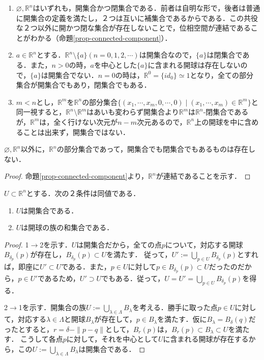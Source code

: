 \documentclass[uplatex,dvipdfmx]{jsreport}
\begin{document}
\begin{example}\mbox{}
    \begin{enumerate}
        \item $\varnothing,\mathbb{R}^n$はいずれも，開集合かつ閉集合である．前者は自明な形で，後者は普通に開集合の定義を満たし，２つは互いに補集合であるからである．この共役な２つ以外に開かつ閉な集合が存在しないことで，位相空間が連結であることがわかる（命題\ref{prop-connected-component}）．
        \item $a\in\mathbb{R}^n$とする．$\mathbb{R}^n\setminus \{a\}(n=0,1,2,\cdots)$は開集合なので，$\{a\}$は閉集合である．また，$n>0$の時，$a$を中心とした$\{a\}$に含まれる開球は存在しないので，$\{a\}$は開集合でない．$n=0$の時は，$\mathbb{R}^0=\{id_0\}\simeq 1$となり，全ての部分集合が開集合でもあり，閉集合でもある．
        \item $m<n$とし，$\mathbb{R}^m$を$\mathbb{R}^n$の部分集合$\{(x_1,\cdots,x_m,0,\cdots,0)\mid (x_1,\cdots,x_m)\in\mathbb{R}^m\}$と同一視すると，$\mathbb{R}^n\setminus\mathbb{R}^m$はあいも変わらず開集合より$\mathbb{R}^m$は$\mathbb{R}^n$-閉集合であるが，$\mathbb{R}^m$は，全く行けない次元が$n-m$次元あるので，$\mathbb{R}^n$上の開球を中に含めることは出来ず，開集合ではない．
    \end{enumerate}
\end{example}

\begin{proposition}[Euclid空間の連結性]
    $\varnothing,\mathbb{R}^n$以外に，$\mathbb{R}^n$の部分集合であって，開集合でも閉集合でもあるものは存在しない．
\end{proposition}
\begin{proof}
    命題\ref{prop-connected-component}より，$\mathbb{R}^n$が連結であることを示す．
\end{proof}

\begin{proposition}[開集合の特徴付け１]
    $U\subset\mathbb{R}^n$とする．次の２条件は同値である．
    \begin{enumerate}
        \item $U$は開集合である．
        \item $U$は開球の族の和集合である．
    \end{enumerate}
\end{proposition}
\begin{proof}
    1$\to$2を示す．$U$は開集合だから，全ての点$p$について，対応する開球$B_{\delta_p}(p)$が存在し，$B_{\delta_p}(p)\subset U$を満たす．
    従って，$U':=\bigcup_{p\in U}B_{\delta_p}(p)$とすれば，即座に$U'\subset U$である．また，$p\in U$に対して$p\in B_{\delta_p}(p)\subset U$だったのだから，$p\in U'$であるため，$U'\supset U$でもある．従って，$U=U'=\bigcup_{p\in U}B_{\delta_p}(p)$を得る．

    2$\to$1を示す．開集合の族$U:=\bigcup_{\lambda\in\Lambda}B_\lambda$を考える．勝手に取った点$p\in U$に対して，対応する$\lambda\in\Lambda$と開球$B_\lambda$が存在して，$p\in B_\lambda$を満たす．仮に$B_\lambda=B_{\delta}(q)$だったとすると，$r=\delta -\|p-q\|$として，$B_{r}(p)$は，$B_{r}(p)\subset B_\lambda\subset U$を満たす．
    こうして各点$p$に対して，それを中心として$U$に含まれる開球が存在するから，この$U:=\bigcup_{\lambda\in\Lambda}B_\lambda$は開集合である．
\end{proof}
\end{document}
